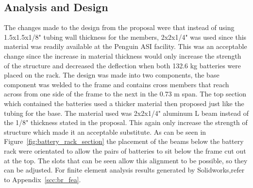\subsection{Analysis and Design}
The changes made to the design from the proposal were that instead of using 1.5x1.5x1/8" tubing wall thickness for the members, 2x2x1/4" was used since this material was readily available at the Penguin ASI facility. This was an acceptable change since the increase in material thickness would only increase the strength of the structure and decreased the deflection when both 132.6 kg batteries were placed on the rack. The design was made into two components, the base component was welded to the frame and contains cross members that reach across from one side of the frame to the next in the 0.73 m span. The top section which contained the batteries used a thicker material then proposed just like the tubing for the base. The material used was 2x2x1/4" aluminum L beam instead of the 1/8" thickness stated in the proposal. This again only increase the strength of structure which made it an acceptable substitute. As can be seen in Figure~\ref{fig:battery_rack_section} the placement of the beams below the battery rack were orientated to allow the pairs of batteries to sit below the frame cut out at the top. The slots that can be seen allow this alignment to be possible, so they can be adjusted. For finite element analysis results generated by Solidworks,refer to Appendix~\ref{scc:br_fea}.




